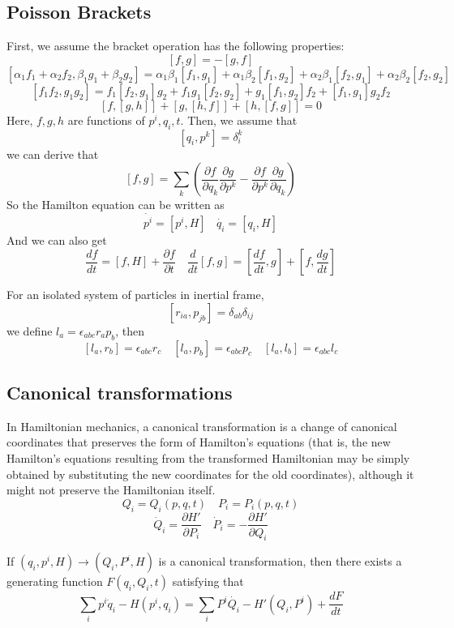 \documentclass[cyan]{elegantnote}
\begin{document}
\subsection{Poisson Brackets}
First, we assume the bracket operation has the following properties:
\[ \left[f,g\right]=-\left[g,f\right] \]
\[\left[\alpha_1 f_1+\alpha_2 f_2,\beta_1 g_1+\beta_2 g_2\right]=\alpha_1 \beta_1\left[f_1,g_1\right]
+\alpha_1 \beta_2\left[f_1,g_2\right]+\alpha_2 \beta_1\left[f_2,g_1\right]+\alpha_2 \beta_2\left[f_2,g_2\right]\]
\[\left[f_1 f_2,g_1 g_2\right]=f_1\left[f_2,g_1\right]g_2+f_1 g_1\left[f_2,g_2\right]+g_1\left[f_1,g_2\right]f_2 +\left[f_1,g_1\right]g_2 f_2 \]
\[\left[f,\left[g,h\right]\right]+\left[g,\left[h,f\right]\right]+\left[h,\left[f,g\right]\right]=0\]
Here, $f,g,h$ are functions of $p^i,q_i,t$.
Then, we assume that
\[\left [q_i,p^k\right ]=\delta^{k}_{i}\]
we can derive that 
\[ \left[f,g\right]=\sum_k(\frac{\partial f}{\partial q_k} \frac{\partial g}{\partial p^k} - \frac{\partial f}{\partial p^k} \frac{\partial g}{\partial q_k}  )\]
So the Hamilton equation can be written as
\[\dot{p^i}=\left[ p^i,H \right] \ \ \ \ \dot{q_i}=\left[ q_i,H \right]\]
And we can also get
\[\frac{df}{dt} = [f,H] + \frac{\partial f}{\partial t} \quad \frac{d}{dt} [f,g] = [\frac{df}{dt},g] + [f,\frac{dg}{dt}]\]
\begin{example}
 For an isolated system of particles in inertial frame, 
\[[r_{ia},p_{jb}] = \delta_{ab} \delta_{ij}\]
we define $l_a = \epsilon_{abc} r_{a} p_{b}$, then
\[[l_a,r_b] = \epsilon_{abc}r_c \quad [l_a,p_b] = \epsilon_{abc}p_c \quad [l_a,l_b] = \epsilon_{abc}l_c\]
\end{example}

\subsection{Canonical transformations}
In Hamiltonian mechanics, a canonical transformation is a change of canonical coordinates that preserves the form of Hamilton's equations (that is, the new Hamilton's equations resulting from the transformed Hamiltonian may be simply obtained by substituting the new coordinates for the old coordinates), although it might not preserve the Hamiltonian itself. 
\[Q_i = Q_i(p,q,t) \quad P_i=P_i(p,q,t)\]
\[\dot{Q}_i = \frac{\partial H'}{\partial P_i} \quad \dot{P}_i = -\frac{\partial H'}{\partial Q_i}\]

\begin{newprop}
If $(q_i,p^i,H) \to (Q_i,P^i,H)$ is a canonical transformation, then there exists a generating function $F(q_i,Q_i,t)$ satisfying that
\[\sum_i p^i\dot{q}_i-H(p^i,q_i) = \sum_i P^i\dot{Q_i} - H'(Q_i,P^i) + \frac{dF}{dt}\]
\end{newprop}
\end{document}
